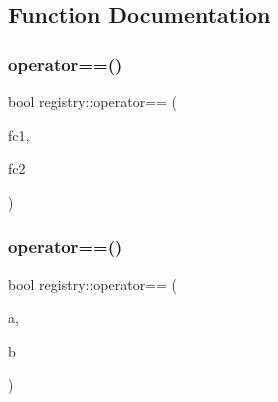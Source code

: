 \subsection{Function Documentation}
\mbox{\label{namespaceregistry_ab4ecf4356115299551ca38f2f3cf15e1}} 
\subsubsection{\texorpdfstring{operator==()}{operator==()}\hspace{0.1cm}{\footnotesize\ttfamily [1/3]}}
{\footnotesize\ttfamily bool registry\+::operator== (\begin{DoxyParamCaption}\item[{\hyperlink{classregistry_1_1AbstractRegistry_a31f6bef634dcd324efebaf55f99b950f}{Abstract\+Registry\+::\+Filter\+Callback} const \&}]{fc1,  }\item[{\hyperlink{classregistry_1_1AbstractRegistry_a31f6bef634dcd324efebaf55f99b950f}{Abstract\+Registry\+::\+Filter\+Callback} const \&}]{fc2 }\end{DoxyParamCaption})}

\mbox{\label{namespaceregistry_a3aea015bffedea5734787cec200bfe1b}} 
\subsubsection{\texorpdfstring{operator==()}{operator==()}\hspace{0.1cm}{\footnotesize\ttfamily [2/3]}}
{\footnotesize\ttfamily bool registry\+::operator== (\begin{DoxyParamCaption}\item[{\hyperlink{classregistry_1_1RegItem}{Reg\+Item} const \&}]{a,  }\item[{\hyperlink{classregistry_1_1RegItem}{Reg\+Item} const \&}]{b }\end{DoxyParamCaption})\hspace{0.3cm}{\ttfamily [inline]}}

